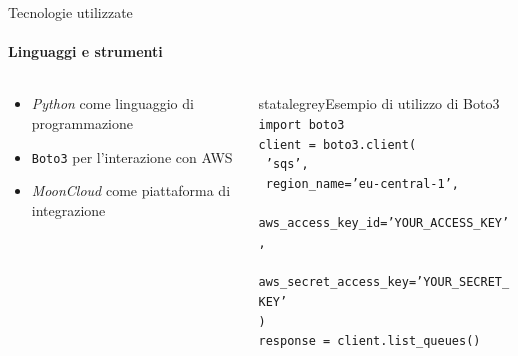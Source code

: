 \documentclass{beamer}
\begin{document}
\begin{frame}{Tecnologie utilizzate}
    \framesubtitle{Linguaggi e strumenti}
    \begin{columns}
        \begin{column}{0.4\textwidth}
            \begin{itemize}
                \item \emph{Python} come linguaggio di programmazione
                \item \texttt{Boto3} per l'interazione con AWS
                \item \emph{MoonCloud} come piattaforma di integrazione
            \end{itemize}
        \end{column}
        \begin{column}{0.6\textwidth}
            \begin{colorblock}[black]{statalegrey}{Esempio di utilizzo di Boto3}
                \texttt{\textcolor{maincolor}{import} boto3}\\
                \texttt{client = boto3.\textcolor{maincolor}{client}(}\\
                \texttt{    \textcolor{statalegreen}{'sqs'},}\\
                \texttt{    region\_name=\textcolor{statalegreen}{'eu-central-1'},}\\
                \texttt{    aws\_access\_key\_id=\textcolor{statalegreen}{'YOUR\_ACCESS\_KEY'},}\\
                \texttt{    aws\_secret\_access\_key=\textcolor{statalegreen}{'YOUR\_SECRET\_KEY'}}\\
                \texttt{)}\\
                \texttt{response = client.\textcolor{maincolor}{list\_queues}()}\\
            \end{colorblock}
        \end{column}
    \end{columns}
\end{frame}
\end{document}
